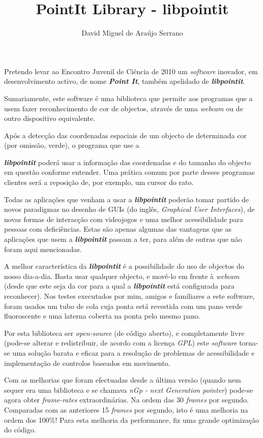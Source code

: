 \documentclass[a4paper,oneside]{article}
\title{PointIt Library - libpointit}
\author{David Miguel de Araújo Serrano}
\begin{document}
\maketitle

Pretendo levar ao Encontro Juvenil de Ciência de 2010 um \emph{software}
inovador, em desenvolvimento activo, de nome {\bf \emph{Point It}}, também
apelidado de {\bf \emph{libpointit}}.

Sumariamente, este software é uma biblioteca que permite aos programas que a
usem fazer reconhecimento de cor de objectos, através de uma
\emph{webcam} ou de outro dispositivo equivalente.

Após a detecção das coordenadas espaciais de um objecto de determinada cor
(por omissão, verde), o programa que use a {{\bf \emph{libpointit}} poderá usar
a informação das coordenadas e do tamanho do objecto em questão conforme
entender. Uma prática comum por parte desses programas clientes será a
reposição de, por exemplo, um cursor do rato.

Todas as aplicações que venham a usar a {\bf \emph{libpointit}}
poderão tomar partido de novos paradigmas no desenho de GUIs (do inglês,
\emph{Graphical User Interfaces}), de novas formas de interacção com
videojogos e uma melhor acessibilidade para pessoas com deficiências.
Estas são apenas algumas das vantagens que as aplicações que usem a
{\bf \emph{libpointit}} passam a ter, para além de outras que não foram aqui
mencionadas.

A melhor característica da {\bf \emph{libpointit}} é a possibilidade do uso
de objectos do nosso dia-a-dia. Basta usar qualquer objecto, e movê-lo em frente
à \emph{webcam} (desde que este seja da cor para a qual a {\bf \emph{libpointit}}
está configurada para reconhecer). Nos testes executados por mim, amigos e familiares
a este software, foram usados um tubo de cola cuja ponta está revestida com um pano
verde fluoroscente e uma laterna coberta na ponta pelo mesmo pano.

Por esta biblioteca ser \emph{open-source} (de código aberto), e completamente
livre (pode-se alterar e redistribuir, de acordo com a licença \emph{GPL})
este \emph{software} torna-se uma solução barata e eficaz para a resolução de
problemas de acessibilidade e implementação de controlos baseados em movimento.

Com as melhorias que foram efectuadas desde a última versão (quando nem sequer era
uma biblioteca e se chamava \emph{nGp - next Generation pointer}) pode-se agora obter
\emph{frame-rates} extraordinárias. Na ordem das 30 \emph{frames} por segundo. Comparadas
com as anteriores 15 \emph{frames} por segundo, isto é uma melhoria na ordem dos 100\%!
Para esta melhoria da performance, fiz uma grande optimização do código.

}
\end{document}
